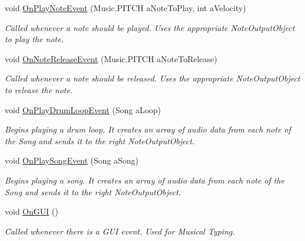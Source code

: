\begin{DoxyCompactItemize}
void \hyperlink{group___virtual_instrument_manager_a80b3821df3b1488a150f6062638f105c}{On\+Play\+Note\+Event} (Music.\+P\+I\+T\+CH a\+Note\+To\+Play, int a\+Velocity)
\begin{DoxyCompactList}\small\item\em Called whenever a note should be played. Uses the appropriate Note\+Output\+Object to play the note. \end{DoxyCompactList}\item 
void \hyperlink{group___virtual_instrument_manager_adae914ac99141bc37853d3c536c3943a}{On\+Note\+Release\+Event} (Music.\+P\+I\+T\+CH a\+Note\+To\+Release)
\begin{DoxyCompactList}\small\item\em Called whenever a note should be released. Uses the appropriate Note\+Output\+Object to release the note. \end{DoxyCompactList}\item 
void \hyperlink{group___virtual_instrument_manager_ae2e2010b9a36ae2409466181ae0b9679}{On\+Play\+Drum\+Loop\+Event} (Song a\+Loop)
\begin{DoxyCompactList}\small\item\em Begins playing a drum loop. It creates an array of audio data from each note of the Song and sends it to the right Note\+Output\+Object. \end{DoxyCompactList}\item 
void \hyperlink{group___virtual_instrument_manager_a7fd877a7d429403abbfd2728aa63c056}{On\+Play\+Song\+Event} (Song a\+Song)
\begin{DoxyCompactList}\small\item\em Begins playing a song. It creates an array of audio data from each note of the Song and sends it to the right Note\+Output\+Object. \end{DoxyCompactList}\item 
void \hyperlink{group___virtual_instrument_manager_ac64ceff10f8db3a11868f251cea72349}{On\+G\+UI} ()
\begin{DoxyCompactList}\small\item\em Called whenever there is a G\+UI event. Used for Musical Typing. \end{DoxyCompactList}\end{DoxyCompactItemize}



